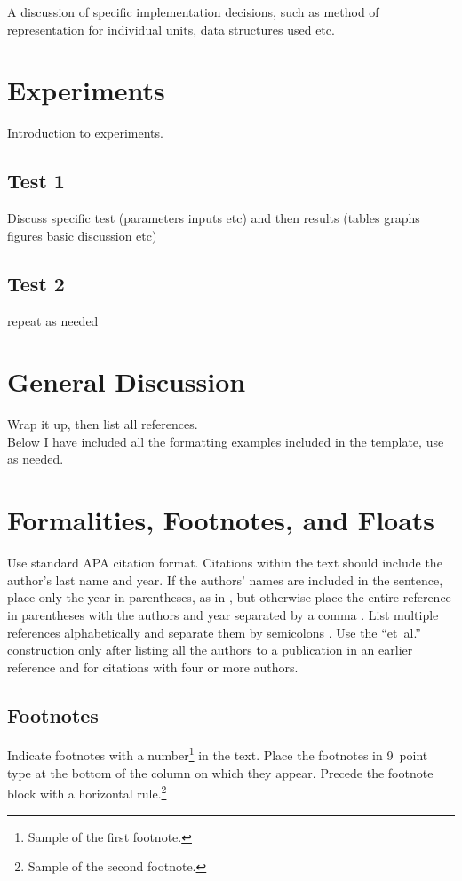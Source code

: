 \documentclass[10pt,letterpaper]{article}
\begin{document}
A discussion of specific implementation decisions, such as method of representation for individual units, data structures used etc.

\section{Experiments}
Introduction to experiments.
\subsection{Test 1}
Discuss specific test (parameters inputs etc) and then results (tables graphs figures basic discussion etc) 
\subsection{Test 2}
repeat as needed

\section{General Discussion}
Wrap it up, then list all references. \\
Below I have included all the formatting examples included in the template, use as needed.
\newpage
\section{Formalities, Footnotes, and Floats}

Use standard APA citation format. Citations within the text should
include the author's last name and year. If the authors' names are
included in the sentence, place only the year in parentheses, as in
, but otherwise place the entire reference in
parentheses with the authors and year separated by a comma
\cite{NewellSimon1972a}. List multiple references alphabetically and
separate them by semicolons
\cite{ChalnickBillman1988a,NewellSimon1972a}. Use the
``et~al.'' construction only after listing all the authors to a
publication in an earlier reference and for citations with four or
more authors.


\subsection{Footnotes}

Indicate footnotes with a number\footnote{Sample of the first
footnote.} in the text. Place the footnotes in 9~point type at the
bottom of the column on which they appear. Precede the footnote block
with a horizontal rule.\footnote{Sample of the second footnote.}
\end{document}
